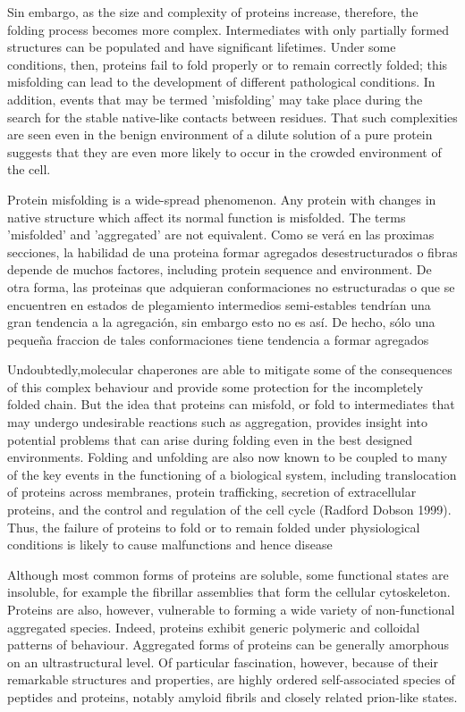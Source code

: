 Sin embargo, as the size and complexity of proteins increase, therefore, the folding process becomes more complex. 
Intermediates with only partially formed structures can be populated and have significant lifetimes. 
Under some conditions, then, proteins fail to fold properly or to remain correctly folded; this misfolding can lead to the development of different pathological conditions.
In addition, events that may be termed 'misfolding' may take place during the search for the stable native-like contacts between residues. 
That such complexities are seen even in the benign environment of a dilute solution of a pure protein suggests that they are even more likely to occur in the crowded environment of the cell.

Protein misfolding is a wide-spread phenomenon. Any protein with changes in native structure which affect its normal function is misfolded. 
The terms 'misfolded' and 'aggregated' are not equivalent. Como se verá en las proximas secciones, la habilidad de una proteina formar agregados desestructurados o fibras depende de muchos factores, including protein sequence and environment.
De otra forma, las proteinas que adquieran conformaciones no estructuradas o que se encuentren en estados de plegamiento intermedios semi-estables tendrían una gran tendencia a la agregación, sin embargo esto no es así. 
De hecho, sólo una pequeña fraccion de tales conformaciones tiene tendencia a formar agregados


Undoubtedly,molecular chaperones are able to mitigate some of the consequences of this complex behaviour and provide some protection for the incompletely folded chain. 
But the idea that proteins can misfold, or fold to intermediates that may undergo undesirable reactions such as aggregation, provides insight into potential problems that can arise during folding even in the best designed environments.
Folding and unfolding are also now known to be coupled to many of the key events in the functioning of a biological system, including translocation of proteins across membranes, protein trafficking, 
secretion of extracellular proteins, and the control and regulation of the cell cycle (Radford  Dobson 1999).
Thus, the failure of proteins to fold or to remain folded under physiological conditions is likely to cause malfunctions and hence disease







Although most common forms of proteins are
soluble, some functional states are insoluble,
for example the fibrillar assemblies that form the cellular
cytoskeleton. Proteins are also, however,
vulnerable to forming a wide variety of non-functional
aggregated species. 
Indeed, proteins exhibit generic polymeric and colloidal patterns of behaviour.
Aggregated forms of proteins can be generally amorphous on an ultrastructural level. Of particular fascination, however, because of their
remarkable structures and properties, are highly ordered
self-associated species of peptides and proteins, notably
amyloid fibrils and closely related prion-like states.


